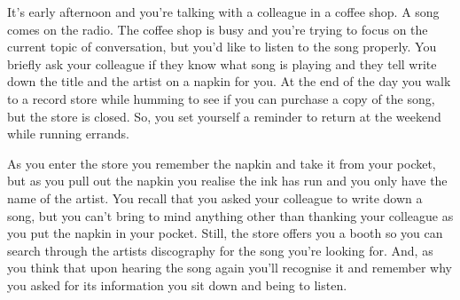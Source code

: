 \documentclass[10pt]{article}
\begin{document}

\begin{scenario}\label{scn:song}
  It's early afternoon and you're talking with a colleague in a coffee shop.
  A song comes on the radio.
  The coffee shop is busy and you're trying to focus on the current topic of conversation, but you'd like to listen to the song properly.
  You briefly ask your colleague if they know what song is playing and they tell write down the title and the artist on a napkin for you.
  At the end of the day you walk to a record store while humming to see if you can purchase a copy of the song, but the store is closed.
  So, you set yourself a reminder to return at the weekend while running errands.

  As you enter the store you remember the napkin and take it from your pocket, but as you pull out the napkin you realise the ink has run and you only have the name of the artist.
  You recall that you asked your colleague to write down a song, but you can't bring to mind anything other than thanking your colleague as you put the napkin in your pocket.
  Still, the store offers you a booth so you can search through the artists discography for the song you're looking for.
  And, as you think that upon hearing the song again you'll recognise it and remember why you asked for its information you sit down and being to listen.
\end{scenario}
\end{document}
